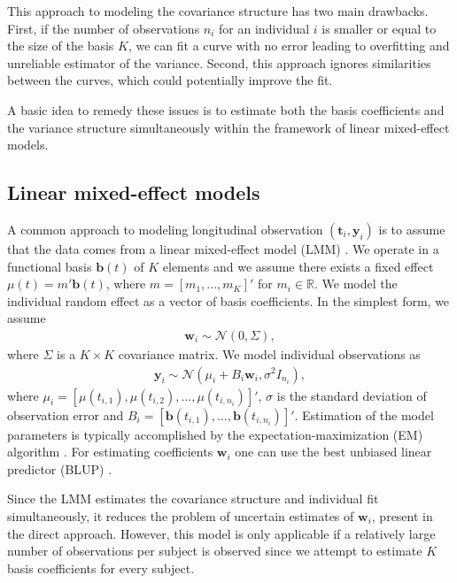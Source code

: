 \documentclass[preprint]{imsart}
\numberwithin{equation}{section}
\theoremstyle{plain}
\newcommand{\cN}{\mathcal{N}}
\newcommand{\R}{\mathbb{R}}
\newcommand{\bb}{\mathbf{b}}
\newcommand{\bw}{\mathbf{w}}
\begin{document}
This approach to modeling the covariance structure has two main drawbacks. First, if the number of observations $n_i$ for an individual $i$ is smaller or equal to the size of the basis $K$, we can fit a curve with no error leading to overfitting and unreliable estimator of the variance. Second, this approach ignores similarities between the curves, which could potentially improve the fit.

A basic idea to remedy these issues is to estimate both the basis coefficients and the variance structure simultaneously within the framework of linear mixed-effect models.

\subsection{Linear mixed-effect models}\label{ss:lmm}

A common approach to modeling longitudinal observation $(\mathbf{t}_i, \mathbf{y}_i)$ is to assume that the data comes from a linear mixed-effect model (LMM) \citep{verbeke1997linear, zeger1988models}. We operate in a functional basis $\bb(t)$ of $K$ elements and we assume there exists a fixed effect $\mu(t) = m' \bb(t)$, where $m = [m_1,...,m_K]'$ for $m_i \in \R$. We model the individual random effect as a vector of basis coefficients. In the simplest form, we assume
\begin{align}\label{eq:latent-probabilistic}
 \mathbf{w}_i \sim \cN(0, \Sigma),
\end{align}
where $\Sigma$ is a $K \times K$ covariance matrix. We model individual observations as
\begin{align}\label{eq:probabilistic}
 \mathbf{y}_i \sim \cN(\mu_i + B_i\mathbf{w}_i, \sigma^2I_{n_i}),
\end{align}
where $\mu_i = [\mu(t_{i,1}),\mu(t_{i,2}),...,\mu(t_{i,n_i})]'$, $\sigma$ is the standard deviation of observation error and $B_i = [\bb(t_{i,1}),...,\bb(t_{i,n_i})]'$. Estimation of the model parameters is typically accomplished by the expectation-maximization (EM) algorithm \citep{laird1982random}. For estimating coefficients $\bw_i$ one can use the best unbiased linear predictor (BLUP) \citep{henderson1950estimation,robinson1991blup}. %

Since the LMM estimates the covariance structure and individual fit simultaneously, it reduces the problem of uncertain estimates of $\bw_i$, present in the direct approach. However, this model is only applicable if a relatively large number of observations per subject is observed since we attempt to estimate $K$ basis coefficients for every subject.
\end{document}
